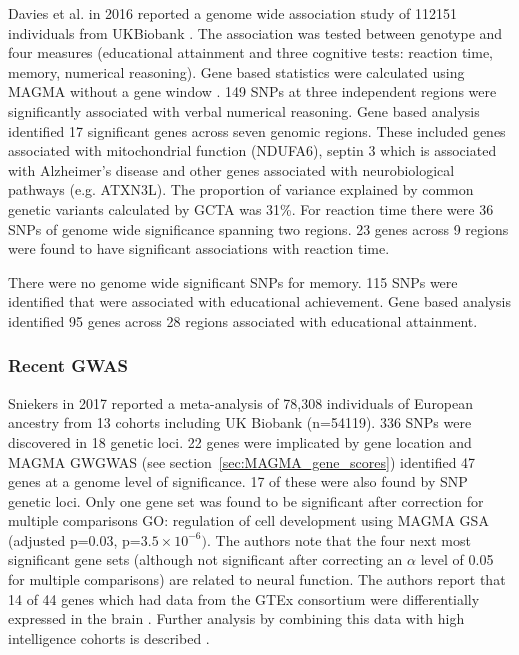 Davies et al.\cite{davies2016genome} in 2016 reported a genome wide association study of 112151 individuals from UKBiobank \cite{bycroft2018uk} \cite{elliott2008uk}. The association was tested between genotype and four measures (educational attainment and three cognitive tests: reaction time, memory, numerical reasoning). Gene
based statistics were calculated using MAGMA without a gene window
\cite{de2015magma}. 149 SNPs at three independent regions were significantly associated with verbal numerical reasoning. Gene based analysis identified 17 significant genes across seven genomic regions. These included genes associated with mitochondrial function (NDUFA6), septin 3 which is associated with Alzheimer's disease and other genes associated with neurobiological pathways (e.g. ATXN3L). The proportion of variance explained by common genetic variants calculated by GCTA was 31\%.
For reaction time there were 36 SNPs of genome wide significance spanning two regions. 23 genes across 9 regions were found to have significant associations with reaction time. 

There were no genome wide significant SNPs for memory. 115 SNPs were identified that were associated with educational achievement. Gene based analysis identified 95 genes across 28 regions associated with educational attainment.

\subsubsection{Recent GWAS}
\label{sec:intelligence intro recent gwas}
Sniekers \cite{sniekers2017genome} in 2017 reported a meta-analysis of 78,308 individuals of European ancestry from 13 cohorts including UK Biobank (n=54119). 336 SNPs were discovered in 18 genetic loci. 22 genes were implicated by gene location and MAGMA GWGWAS (see section~\ref{sec:MAGMA_gene_scores}) identified 47 genes at a genome level of significance. 17 of these were also found by SNP genetic loci. Only one gene set was found to be significant after correction for multiple comparisons GO: regulation of cell development using MAGMA GSA (adjusted p=0.03, p=$3.5 \times 10^{-6})$.\cite{de2015magma} The authors note that the four next most significant gene sets (although not significant after correcting an $\alpha$ level of 0.05 for multiple comparisons) are related to neural function. The authors report that 14 of 44 genes which had data from the GTEx consortium were differentially expressed in the brain \cite{gtex2015genotype}. Further analysis by combining this data with high intelligence cohorts is described \cite{coleman2019biological}.

